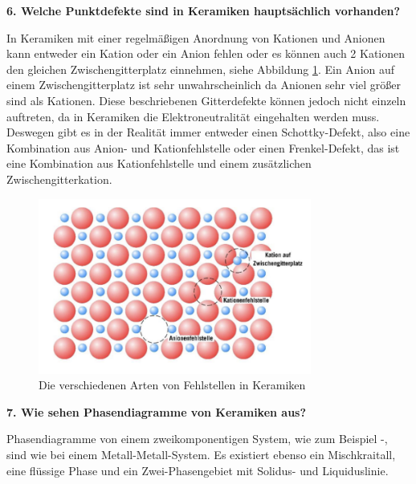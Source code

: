 \noindent\textbf{6. Welche Punktdefekte sind in Keramiken hauptsächlich vorhanden?}\\
\begin{addmargin}[25pt]{0pt}
In Keramiken mit einer regelmäßigen Anordnung von Kationen und Anionen kann entweder ein Kation oder ein Anion fehlen oder es können auch 2 Kationen den gleichen Zwischengitterplatz einnehmen, siehe Abbildung \ref{fig:Fehlstellen_Keramiken}. Ein Anion auf einem Zwischengitterplatz ist sehr unwahrscheinlich da Anionen sehr viel größer sind als Kationen. Diese beschriebenen Gitterdefekte können jedoch nicht einzeln auftreten, da in Keramiken die Elektroneutralität eingehalten werden muss. Deswegen gibt es in der Realität immer entweder einen Schottky-Defekt, also eine Kombination aus Anion- und Kationfehlstelle oder einen Frenkel-Defekt, das ist eine Kombination aus Kationfehlstelle und einem zusätzlichen Zwischengitterkation.\\
\begin{figure}[h]
    \centering
    \includegraphics[width = 0.8\textwidth]{images/Materialwissenschaften/Fehlstellen_Keramiken.jpeg}
    \caption{Die verschiedenen Arten von Fehlstellen in Keramiken}
    \label{fig:Fehlstellen_Keramiken}
\end{figure}
\end{addmargin}

\noindent\textbf{7. Wie sehen Phasendiagramme von Keramiken aus?}\\
\begin{addmargin}[25pt]{0pt}
Phasendiagramme von einem zweikomponentigen System, wie zum Beispiel -, sind wie bei einem Metall-Metall-System. Es existiert ebenso ein Mischkraitall, eine flüssige Phase und ein Zwei-Phasengebiet mit Solidus- und Liquiduslinie.\\
\end{addmargin}

